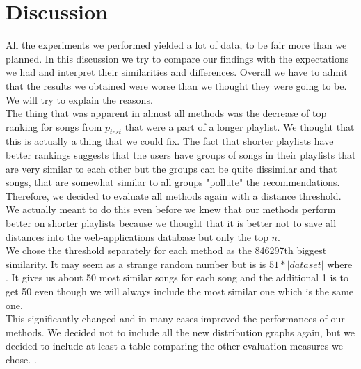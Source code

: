 \section{Discussion}\label{sec:discussion}

All the experiments we performed yielded a lot of data, to be fair more than we planned. In this discussion we try to compare our findings with the expectations we had and interpret their similarities and differences. Overall we have to admit that the results we obtained were worse than we thought they were going to be. We will try to explain the reasons. \\
The thing that was apparent in almost all methods was the decrease of top ranking for songs from $ p_{test}$ that were a part of a longer playlist. We thought that this is actually a thing that we could fix. The fact that shorter playlists have better rankings suggests that the users have groups of songs in their playlists that are very similar to each other but the groups can be quite dissimilar and that songs, that are somewhat similar to all groups "pollute" the recommendations. Therefore, we decided to evaluate all methods again with a distance threshold. We actually meant to do this even before we knew that our methods perform better on shorter playlists because we thought that it is better not to save all distances into the web-applications database but only the top $n$. \\
We chose the threshold separately for each method as the 846297th biggest similarity. It may seem as a strange random number but is is $51*|dataset|$ where . It gives us about 50 most similar songs for each song and the additional 1 is to get 50 even though we will always include the most similar one which is the same one. \\
This significantly changed and in many cases improved the performances of our methods. We decided not to include all the new distribution graphs again,  but we decided to include at least a table comparing the other evaluation measures we chose. .\\
